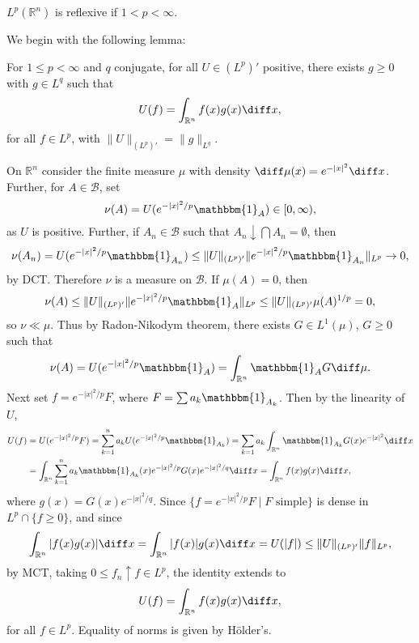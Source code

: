 \documentclass[12pt]{article}
\begin{document}
\begin{corollary}
	$L^p(\mathbb{R}^n)$ is reflexive if $1 < p < \infty$.
\end{corollary}

We begin with the following lemma:

\begin{lemma}
	For $1 \leq p < \infty$ and $q$ conjugate, for all $U \in (L^p)'$ positive, there exists $g \geq 0$ with $g \in L^q$ such that
	\[
		U(f) = \int_{{\mathbb{R}^n}}^{{}} {f(x)g(x)} \diff x,
	\]
	for all $f \in L^p$, with $\|U\|_{(L^p)'} = \|g\|_{L^q}$.
\end{lemma}

\begin{proofbox}
	On $\mathbb{R}^n$ consider the finite measure $\mu$ with density $\diff \mu(x) = e^{-|x|^2} \diff x$. Further, for $A \in \mathcal{B}$, set
	\[
	\nu(A) = U(e^{-|x|^2/p}\mathbbm{1}_{A}) \in [0, \infty),
	\]
	as $U$ is positive. Further, if $A_n \in \mathcal{B}$ such that $A_n \downarrow \bigcap A_n = \emptyset$, then
	\[
	\nu(A_n) = U(e^{-|x|^2/p}\mathbbm{1}_{A_n}) \leq \|U\|_{(L^p)'} \|e^{-|x|^2/p}\mathbbm{1}_{A_n}\|_{L^p} \to 0,
	\]
	by DCT. Therefore $\nu$ is a measure on $\mathcal{B}$. If $\mu(A) = 0$, then
	\[
		\nu(A) \leq \|U\|_{(L^p)'} \|e^{-|x|^2/p}\mathbbm{1}_{A}\|_{L^p} \leq \|U\|_{(L^p)'} \mu(A)^{1/p} = 0,
	\]
	so $\nu \ll \mu$. Thus by Radon-Nikodym theorem, there exists $G \in L^1(\mu)$, $G \geq 0$ such that
	\[
	\nu(A) = U(e^{-|x|^2/p}\mathbbm{1}_{A}) = \int_{\mathbb{R}^n}\mathbbm{1}_{A} G \diff \mu.
	\]
	Next set $f = e^{-|x|^2/p}F$, where $F = \sum a_k \mathbbm{1}_{A_k}$. Then by the linearity of $U$,
	\begin{align*}
		U(f) &= U(e^{-|x|^2/p}F) = \sum_{k = 1}^n a_k U(e^{-|x|^2/p} \mathbbm{1}_{A_k}) = \sum_{k = 1} a_k \int_{\mathbb{R}^n} \mathbbm{1}_{A_k} G(x) e^{-|x|^2} \diff x \\
		     &= \int_{\mathbb{R}^n} \sum_{k = 1}^n a_k \mathbbm{1}_{A_k}(x) e^{-|x|^2/p} G(x) e^{-|x|^2/q} \diff x = \int_{\mathbb{R}^n} f(x) g(x) \diff x,
	\end{align*}
	where $g(x) = G(x) e^{-|x|^2/q}$. Since $\{f = e^{-|x|^2/p}F \mid F \text{ simple}\}$ is dense in $L^p \cap \{f \geq 0\}$, and since
	\[
	\int_{\mathbb{R}^n}|f(x)g(x)| \diff x = \int_{\mathbb{R}^n}|f(x)| g(x) \diff x = U(|f|) \leq \|U\|_{(L^p)'} \|f\|_{L^p},
	\]
	by MCT, taking $0 \leq f_n \uparrow f \in L^p$, the identity extends to
	\[
	U(f) = \int_{\mathbb{R}^n} f(x) g(x) \diff x,
	\]
	for all $f \in L^p$. Equality of norms is given by H\"older's.
\end{proofbox}
\end{document}
